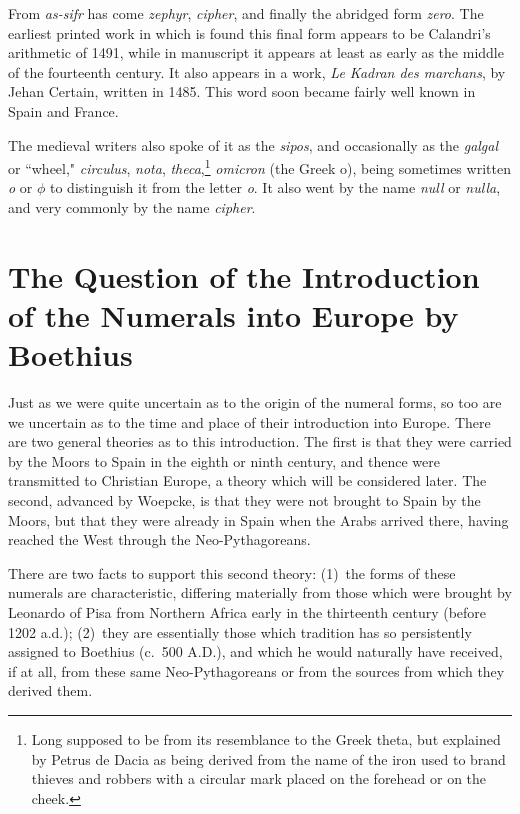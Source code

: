 \documentclass[11pt,a4paper]{article}
\begin{document}
From \textit{as-sifr} has come \textit{zephyr}, \textit{cipher}, and finally the abridged form \textit{zero}. The earliest printed work in which is found this final form appears to be Calandri's arithmetic of 1491, while in manuscript it appears at least as early as the middle of the fourteenth century. It also appears in a work, \textit{Le Kadran des marchans}, by Jehan Certain, written in 1485. This word soon became fairly well known in Spain and France.

The medieval writers also spoke of it as the \textit{sipos}, and occasionally as the \textit{galgal} or ``wheel," \textit{circulus}, \textit{nota}, \textit{theca},\footnote{Long supposed to be from its resemblance to the Greek theta, but explained by Petrus de Dacia as being derived from the name of the iron used to brand thieves and robbers with a circular mark placed on the forehead or on the cheek.} \textit{omicron} (the Greek o), being sometimes written \textit{o} or $\phi$ to distinguish it from the letter \textit{o}. It also went by the name \textit{null} or \textit{nulla}, and very commonly by the name \textit{cipher}.

\newpage

\section{The Question of the Introduction of the Numerals into Europe by Boethius}

Just as we were quite uncertain as to the origin of the numeral forms, so too are we uncertain as to the time and place of their introduction into Europe. There are two general theories as to this introduction. The first is that they were carried by the Moors to Spain in the eighth or ninth century, and thence were transmitted to Christian Europe, a theory which will be considered later. The second, advanced by Woepcke, is that they were not brought to Spain by the Moors, but that they were already in Spain when the Arabs arrived there, having reached the West through the Neo-Pythagoreans.

There are two facts to support this second theory: (1)~the forms of these numerals are characteristic, differing materially from those which were brought by Leonardo of Pisa from Northern Africa early in the thirteenth century (before 1202 a.d.); (2)~they are essentially those which tradition has so persistently assigned to Boethius (c.~500 A.D.), and which he would naturally have received, if at all, from these same Neo-Pythagoreans or from the sources from which they derived them.
\end{document}
